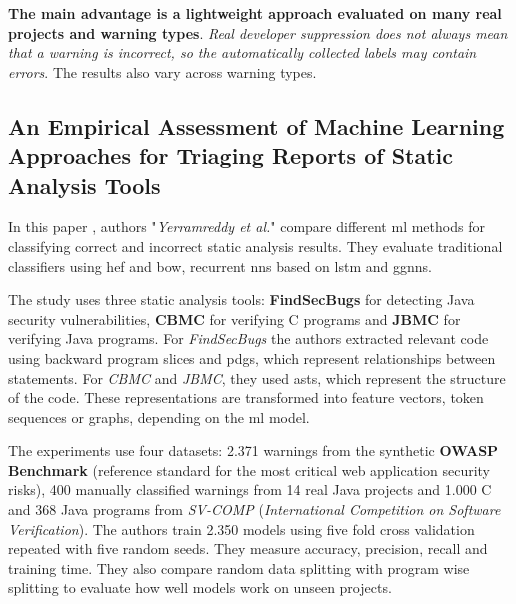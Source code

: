 \hspace{0.6em} \textbf{The main advantage is a lightweight approach evaluated on many real projects and warning types}. \textit{Real developer suppression does not always mean that a warning is incorrect, so the automatically collected labels may contain errors}. The results also vary across warning types.




\subsection{An Empirical Assessment of Machine Learning Approaches for Triaging Reports of Static Analysis Tools}

\hspace{0.6em} In this paper \cite{paper3_yerramreddy2023empirical}, authors "\textit{Yerramreddy et al.}" compare different \gls{ml} methods for classifying correct and incorrect static analysis results. They evaluate traditional classifiers using \gls{hef} and \gls{bow}, recurrent \gls{nns} based on \gls{lstm} and \gls{ggnns}.

\hspace{0.6em} The study uses three static analysis tools: \textbf{FindSecBugs} \cite{findsecbugs} for detecting Java security vulnerabilities, \textbf{CBMC} \cite{clarke2004cbmc} for verifying C programs and \textbf{JBMC} \cite{cordeiro2018jbmc} for verifying Java programs. For \textit{FindSecBugs} the authors extracted relevant code using backward program slices and \gls{pdgs}, which represent relationships between statements. For \textit{CBMC} and \textit{JBMC}, they used \gls{asts}, which represent the structure of the code. These representations are transformed into feature vectors, token sequences or graphs, depending on the \gls{ml} model.

\hspace{0.6em} The experiments use four datasets: 2.371 warnings from the synthetic \textbf{OWASP Benchmark} (reference standard for the most critical web application security risks), 400 manually classified warnings from 14 real Java projects and 1.000 C and 368 Java programs from \textit{SV-COMP} (\textit{International Competition on Software Verification}). The authors train 2.350 models using five fold cross validation repeated with five random seeds. They measure accuracy, precision, recall and training time. They also compare random data splitting with program wise splitting to evaluate how well models work on unseen projects.

